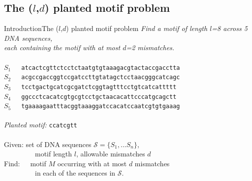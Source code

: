 \documentclass[pdf,xcolor={dvipsnames}]{beamer}
\begin{document}
	\subsection{The ($l$,$d$) planted motif problem}
	\begin{frame}{Introduction}{The ($l$,$d$) planted motif problem}
		{
		\centering
		\emph{Find a motif of length $l$=8 across 5 DNA sequences,}\\
		\emph{each containing the motif with at most $d$=2 mismatches.}\\
		\ \\
		\footnotesize
		$S_1$\ \ \  \texttt{at{\color{blue}c{ac}tcgtt}ctcctctaatgtgtaaagacgtactaccgacctta}\\
		$S_2$\ \ \  \texttt{acgccgaccggtc{\color{blue}c{g}atc{c}tt}gtatagctcctaacgggcatcagc}\\
		$S_3$\ \ \  \texttt{tcctgactgcatcgcgatctcggtagtttcctgt{\color{blue}{t}catc{a}tt}ttt}\\
		$S_4$\ \ \  \texttt{ggccctca{\color{blue}{g}catcgt{g}}cgtcctgctaacacattcccatgcagctt}\\
		$S_5$\ \ \  \texttt{tgaaaagaatttacggtaaaggatccacatc{\color{blue}c{a}atcgt{g}}tgaaag}\\ 
		\ \\
		\emph{Planted motif: }\texttt{\color{blue}ccatcgtt}\\
		\ \\
		}
		\hspace*{0.1\textwidth} Given: set of DNA sequences $\mathcal{S} = \{S_{1},...S_{n}\}$,\\
		\hspace*{0.1\textwidth} \ \ \ \ \ \ \ \ \  motif length $l$, allowable mismatches $d$\\
		\hspace*{0.1\textwidth} Find:\ \ \ motif $M$ occurring with at most $d$ mismatches\\
		\hspace*{0.1\textwidth} \ \ \ \ \ \ \ \ \ in each of the sequences in $\mathcal{S}$.

		\end{frame}
\end{document}
